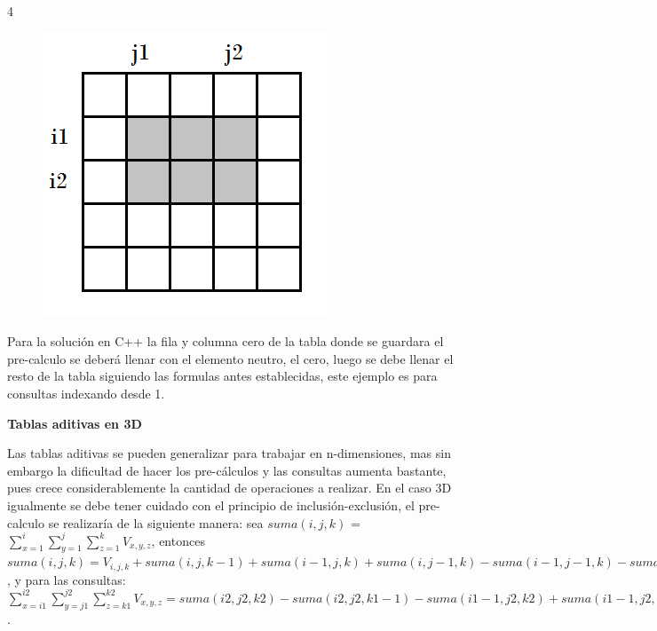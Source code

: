 \documentclass[12pt, a4paper]{article}
\newcommand\cppfile[2][]{

}
\newcommand{\subtitulo}[1]{\begin{center}\textbf{#1}\end{center}}
\begin{document}
\begin{center}
\begin{multicols}{4}
\begin{figure}[H]
				\caption{}
				\label{estructuras:tablas_aditivas:img3}
			\end{figure}
			\columnbreak
			\begin{figure}[H]
				\centering
				\includegraphics[scale=0.4]{Estructuras_de_datos/imagenes/tablas_aditivas/img4}
				\caption{}
				\label{estructuras:tablas_aditivas:img4}
			\end{figure}
    	\end{multicols}
	\end{center}
	
	Para la solución en C++ la fila y columna cero de la tabla donde se guardara el pre-calculo se deberá llenar
	con el elemento neutro, el cero, luego se debe llenar el resto de la tabla siguiendo las formulas antes 
	establecidas, este ejemplo es para consultas indexando desde 1.
	\cppfile[26-36]{Estructuras_de_datos/codigos/tablas_aditivas.cpp}
	
	\subtitulo{Tablas aditivas en 3D}
	
	Las tablas aditivas se pueden generalizar para trabajar en n-dimensiones, mas sin embargo la dificultad de hacer 
	los pre-cálculos y las consultas aumenta bastante, pues crece considerablemente la cantidad de operaciones a
	realizar. En el caso 3D igualmente se debe tener cuidado con el principio de inclusión-exclusión, el 
	pre-calculo se realizaría de la siguiente manera: sea 
	$suma(i,j,k)$ = $\sum_{x=1}^{i} \sum_{y=1}^{j} \sum_{z=1}^{k} V_{x,y,z}$, entonces  
	$suma(i,j,k) = V_{i,j,k} + suma(i,j,k-1)+suma(i-1,j,k)+suma(i,j-1,k)-suma(i-1,j-1,k)-suma(i-1,j,k-1)
	-suma(i,j-1,k-1)+suma(i-1,j-1,k-1)$, y para las consultas: $\sum_{x=i1}^{i2} \sum_{y=j1}^{j2} \sum_{z=k1}^{k2}
	V_{x,y,z} = suma(i2,j2,k2)-suma(i2,j2,k1-1)-suma(i1-1,j2,k2)+suma(i1-1,j2,k1-1)-suma(i2,j1-1,k2)
	+suma(i2,j1-1,k1-1)+suma(i1-1,j1-1,k2)-suma(i1-1,j1-1,k1-1)$.
	
\end{document}
